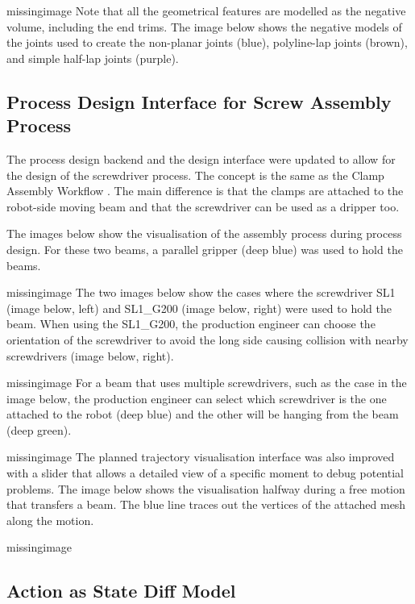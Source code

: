 missingimage
Note that all the geometrical features are modelled as the negative volume, including the end trims. The image below shows the negative models of the joints used to create the non-planar joints (blue), polyline-lap joints (brown), and simple half-lap joints (purple).

\subsection{Process Design Interface for Screw Assembly Process}
\label{subsection:exploration-4-process-design-interface-for-screw-assembly-process}

The process design backend and the design interface were updated to allow for the design of the screwdriver process. The concept is the same as the Clamp Assembly Workflow . The main difference is that the clamps are attached to the robot-side moving beam and that the screwdriver can be used as a dripper too.

The images below show the visualisation of the assembly process during process design. For these two beams, a parallel gripper (deep blue) was used to hold the beams.

missingimage
The two images below show the cases where the screwdriver SL1 (image below, left) and SL1\_G200 (image below, right) were used to hold the beam. When using the SL1\_G200, the production engineer can choose the orientation of the screwdriver to avoid the long side causing collision with nearby screwdrivers (image below, right). 

missingimage
For a beam that uses multiple screwdrivers, such as the case in the image below, the production engineer can select which screwdriver is the one attached to the robot (deep blue) and the other will be hanging from the beam (deep green).

missingimage
The planned trajectory visualisation interface was also improved with a slider that allows a detailed view of a specific moment to debug potential problems. The image below shows the visualisation halfway during a free motion that transfers a beam. The blue line traces out the vertices of the attached mesh along the motion.

missingimage

\subsection{Action as State Diff Model} 
\label{subsection:exploration-4-action-as-state-diff-model}

